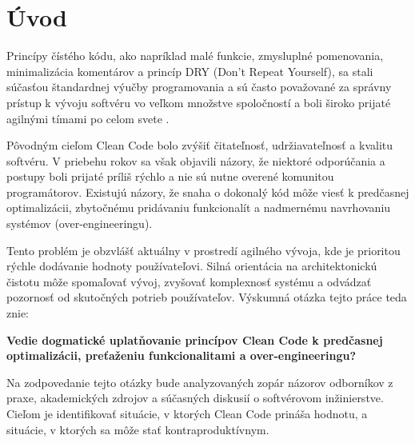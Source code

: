 \section{Úvod}

Princípy čístého kódu, ako napríklad malé funkcie, zmysluplné pomenovania, minimalizácia komentárov a princíp DRY (Don't Repeat Yourself), sa stali súčasťou štandardnej výučby programovania a sú často považované za správny prístup k vývoju softvéru vo veľkom množstve spoločností a boli široko prijaté agilnými tímami po celom svete \cite{CLEANCODE_MARTIN2008}.

Pôvodným cieľom Clean Code bolo zvýšiť čitateľnosť, udržiavateľnosť a kvalitu softvéru. V priebehu rokov sa však objavili názory, že niektoré odporúčania a postupy boli prijaté príliš rýchlo a nie sú nutne overené komunitou programátorov. Existujú názory, že snaha o dokonalý kód môže viesť k predčasnej optimalizácii, zbytočnému pridávaniu funkcionalít a nadmernému navrhovaniu systémov (over-engineeringu).

Tento problém je obzvlášť aktuálny v prostredí agilného vývoja, kde je prioritou rýchle dodávanie hodnoty používateľovi. Silná orientácia na architektonickú čistotu môže spomaľovať vývoj, zvyšovať komplexnosť systému a odvádzať pozornosť od skutočných potrieb používateľov. Výskumná otázka tejto práce teda znie:

\textbf{Vedie dogmatické uplatňovanie princípov Clean Code k predčasnej optimalizácii, preťaženiu funkcionalitami a over-engineeringu?}

Na zodpovedanie tejto otázky bude analyzovaných zopár názorov odborníkov z praxe, akademických zdrojov a súčasných diskusií o softvérovom inžinierstve. Cieľom je identifikovať situácie, v ktorých Clean Code prináša hodnotu, a situácie, v ktorých sa môže stať kontraproduktívnym.